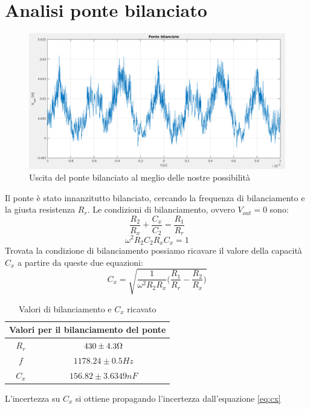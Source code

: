 \documentclass[12pt,]{article}
\begin{document}
\section{Analisi ponte bilanciato}
\begin{figure}[H]
\centering
\includegraphics[width=\textwidth]{pontebilanciato}
\caption{Uscita del ponte bilanciato al meglio delle nostre possibilità}
\end{figure}
Il ponte è stato innanzitutto bilanciato, cercando la frequenza di bilanciamento e la giusta resistenza $R_r$. Le condizioni di bilanciamento, ovvero $V_{out}=0$ sono: 
 \begin{equation}
 \frac{R_2}{R_x} + \frac{C_x}{C_2} = \frac{R_1}{R_r}
 \end{equation}
 \begin{equation}
 \omega^2 R_2  C_2  R_x  C_x = 1 
 \end{equation}
Trovata la condizione di bilanciamento possiamo ricavare il valore della capacità $C_x$ a partire da queste due equazioni: 
\begin{equation}
\label{eq:cx}
C_x = \sqrt{\frac{1}{\omega^2 R_2 R_x} \biggl(\frac{R_1}{R_r} - \frac{R_2}{R_x} \biggr)}
\end{equation}
\begin{table}[H]
\centering
\begin{tabular}{c|c}
\toprule
\multicolumn{2}{c}{Valori per il bilanciamento del ponte}\\
\midrule
\rowcolor{black!20}$R_r$ & $430 \pm 4.3  \ohm$ \\
$f$ & $ 1178.24\pm 0.5 Hz $ \\
\rowcolor{black!20}$C_x$ & $156.82 \pm 3.6349 nF $ \\
\bottomrule
\end{tabular}
\caption{Valori di bilanciamento e $C_x$ ricavato}
\end{table}
L'incertezza su $C_x$ si ottiene propagando l'incertezza dall'equazione \eqref{eq:cx}
\end{document}
